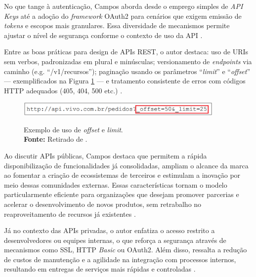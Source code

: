 No que tange à autenticação, Campos aborda desde o emprego simples de \textit{API Keys} até a adoção do \textit{framework} OAuth2 para cenários que exigem emissão de \textit{tokens} e escopos mais granulares. Essa diversidade de mecanismos permite ajustar o nível de segurança conforme o contexto de uso da API \cite{campos2013}. 

Entre as boas práticas para design de APIs REST, o autor destaca: uso de URIs sem verbos, padronizadas em plural e minúsculas; versionamento de \textit{endpoints} via caminho (e.g. “/v1/recursos”); paginação usando os parâmetros “\textit{limit}” e “\textit{offset}” — exemplificados na Figura \ref{fig:offset-limit} — e tratamento consistente de erros com códigos HTTP adequados (405, 404, 500 etc.) \cite{campos2013}.
\par\vspace{0.75\baselineskip}

\begin{figure}[H]
    \centering     
    \caption{
        Exemplo de uso de \textit{offset} e \textit{limit}.\\
        {\footnotesize\textbf{Fonte:} Retirado de .}
    }
    \includegraphics[width=0.9\textwidth]{img/Exemplo do uso de offset e limits.PNG}
    \label{fig:offset-limit}
\end{figure}

\par\vspace{0.75\baselineskip}
Ao discutir APIs públicas, Campos destaca que permitem a rápida disponibilização de funcionalidades já consolidadas, ampliam o alcance da marca ao fomentar a criação de ecossistemas de terceiros e estimulam a inovação por meio dessas comunidades externas. Essas características tornam o modelo particularmente eficiente para organizações que desejam promover parcerias e acelerar o desenvolvimento de novos produtos, sem retrabalho no reaproveitamento de recursos já existentes \cite{campos2013}.

Já no contexto das APIs privadas, o autor enfatiza o acesso restrito a desenvolvedores ou equipes internas, o que reforça a segurança através de mecanismos como SSL, HTTP \textit{Basic} ou OAuth2. Além disso, ressalta a redução de custos de manutenção e a agilidade na integração com processos internos, resultando em entregas de serviços mais rápidas e controladas \cite{campos2013}.

